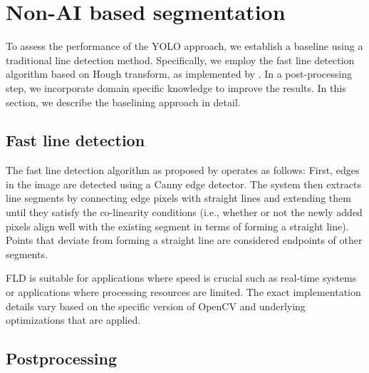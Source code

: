 \documentclass[Master,MDS,english]{BASE/twbook} %
\begin{document}
\section{Non-AI based segmentation}

To assess the performance of the YOLO approach, we establish a baseline using a traditional line detection method. Specifically, we employ the fast line detection algorithm based on Hough transform, as implemented by \cite{FLD}. In a post-processing step, we incorporate domain specific knowledge to improve the results.
In this section, we describe the baselining approach in detail.
 
 \subsection{Fast line detection}


The fast line detection algorithm as proposed by \cite{fld_inproceedings} operates as follows: 
First, edges in the image are detected using a Canny edge detector. The system then extracts line segments by connecting edge pixels with straight lines and extending them until they satisfy the co-linearity conditions (i.e., whether or not the newly added pixels align well with the existing segment in terms of forming a straight line). Points that deviate from forming a straight line are considered endpoints of other segments. 

FLD is suitable for applications where speed is crucial such as real-time systems or applications where processing resources are limited.
The exact implementation details vary based on the specific version of OpenCV and underlying optimizations that are applied.

\subsection{Postprocessing}
\end{document}
